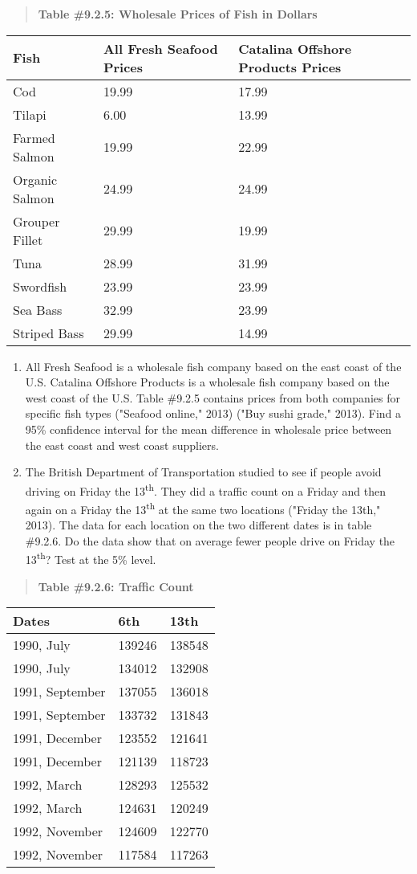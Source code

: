\documentclass[]{book}
\begin{document}
\begin{quote}
\textbf{Table \#9.2.5: Wholesale Prices of Fish in Dollars}
\end{quote}

\begin{longtable}[]{@{}lll@{}}
\toprule
Fish & All Fresh Seafood Prices & Catalina Offshore Products Prices\tabularnewline
\midrule
\endhead
Cod & 19.99 & 17.99\tabularnewline
Tilapi & 6.00 & 13.99\tabularnewline
Farmed Salmon & 19.99 & 22.99\tabularnewline
Organic Salmon & 24.99 & 24.99\tabularnewline
Grouper Fillet & 29.99 & 19.99\tabularnewline
Tuna & 28.99 & 31.99\tabularnewline
Swordfish & 23.99 & 23.99\tabularnewline
Sea Bass & 32.99 & 23.99\tabularnewline
Striped Bass & 29.99 & 14.99\tabularnewline
\bottomrule
\end{longtable}

\begin{enumerate}
\def\labelenumi{\arabic{enumi}.}
\setcounter{enumi}{3}
\item
  All Fresh Seafood is a wholesale fish company based on the east coast of the U.S. Catalina Offshore Products is a wholesale fish company based on the west coast of the U.S. Table \#9.2.5 contains prices from both companies for specific fish types ("Seafood online," 2013) ("Buy sushi grade," 2013). Find a 95\% confidence interval for the mean difference in wholesale price between the east coast and west coast suppliers.
\item
  The British Department of Transportation studied to see if people avoid driving on Friday the 13\textsuperscript{th}. They did a traffic count on a Friday and then again on a Friday the 13\textsuperscript{th} at the same two locations ("Friday the 13th," 2013). The data for each location on the two different dates is in table \#9.2.6. Do the data show that on average fewer people drive on Friday the 13\textsuperscript{th}? Test at the 5\% level.
\end{enumerate}

\begin{quote}
\textbf{Table \#9.2.6: Traffic Count}
\end{quote}

\begin{longtable}[]{@{}lll@{}}
\toprule
Dates & 6th & 13th\tabularnewline
\midrule
\endhead
1990, July & 139246 & 138548\tabularnewline
1990, July & 134012 & 132908\tabularnewline
1991, September & 137055 & 136018\tabularnewline
1991, September & 133732 & 131843\tabularnewline
1991, December & 123552 & 121641\tabularnewline
1991, December & 121139 & 118723\tabularnewline
1992, March & 128293 & 125532\tabularnewline
1992, March & 124631 & 120249\tabularnewline
1992, November & 124609 & 122770\tabularnewline
1992, November & 117584 & 117263\tabularnewline
\bottomrule
\end{longtable}
\end{document}
